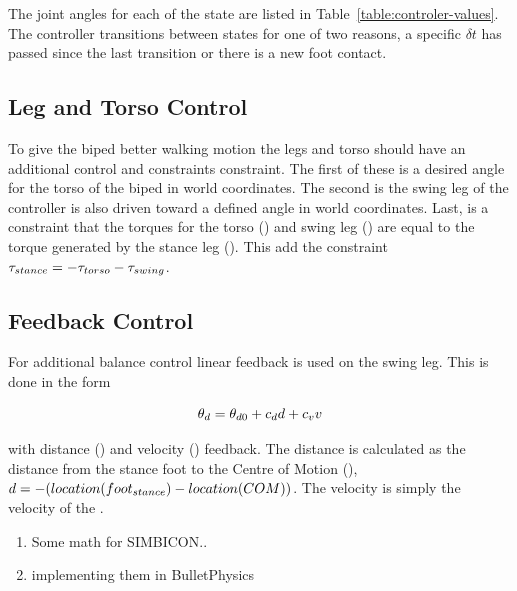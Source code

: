 The joint angles for each of the state are listed in Table~\ref{table:controler-values}.
The controller transitions between states for one of two reasons, a specific $\delta t$ has passed since the last transition or there is a new foot contact.


\subsection{Leg and Torso Control}

To give the biped better walking motion the legs and torso should have an additional control and constraints constraint. 
The first of these is a desired angle for the torso of the biped in world coordinates.
The second is the swing leg of the controller is also driven toward a defined angle in world coordinates.
Last, is a constraint that the torques for the torso (\torqueTorso) and swing leg (\torqueSwing) are equal to the torque generated by the stance leg (\torqueStance). 
This add the constraint $\tau_{stance} = -\tau_{torso} - \tau_{swing}$.

\subsection{Feedback Control}

For additional balance control linear feedback is used on the swing leg. This is done in the form

\begin{equation}
\label{equation:feedback-law}
	\theta_{d} = \theta_{d0} + c_{d} d + c_{v} v
\end{equation}

with distance (\distance) and velocity (\velocity) feedback.
The distance \distance is calculated as the distance from the stance foot to the Centre of Motion (\COM), $d = -(location(foot_{stance}) - location(COM))$.
The velocity \velocity is simply the velocity of the \COM.


\begin{enumerate}
	\item Some math for SIMBICON..
	\item implementing them in BulletPhysics
\end{enumerate}